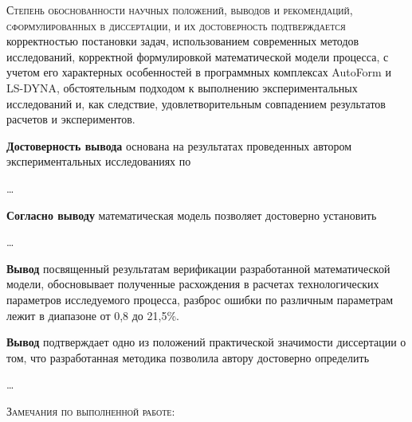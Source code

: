 \textsc{Степень обоснованности научных положений, выводов и рекомендаций, сформулированных в диссертации, и их достоверность подтверждается} корректностью постановки задач, использованием современных методов исследований, корректной формулировкой математической модели процесса, с учетом его характерных особенностей в программных комплексах AutoForm и LS-DYNA, обстоятельным подходом к выполнению экспериментальных исследований и, как следствие, удовлетворительным совпадением результатов расчетов и экспериментов. 

\textbf{Достоверность вывода } основана на результатах проведенных автором экспериментальных исследованиях по

\ldots

\textbf{Согласно выводу } математическая модель позволяет достоверно установить 

\ldots

\textbf{Вывод  } посвященный результатам верификации разработанной математической модели, обосновывает полученные расхождения в расчетах технологических параметров исследуемого процесса, разброс ошибки по различным параметрам лежит в диапазоне от 0,8 до 21,5\%.

\textbf{Вывод  } подтверждает одно из положений практической значимости диссертации о том, что разработанная методика позволила автору достоверно определить 

\ldots

\textsc{Замечания по выполненной работе}:

